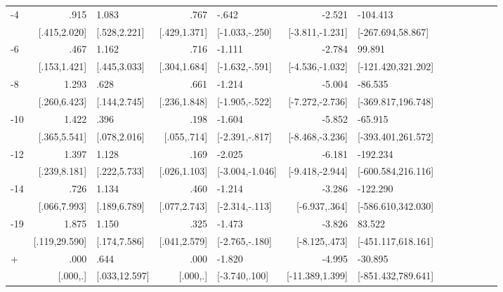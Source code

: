 \begin{table}[h]
\begin{adjustbox}{max width=\linewidth}
\begin{threeparttable}
{\begin{tabular}{l*{6}{D{.}{.}{-1}l}}
-4             &            .915&           1.083&            .767&           -.642&          -2.521&        -104.413\\
                &    [.415,2.020]&    [.528,2.221]&    [.429,1.371]&  [-1.033,-.250]& [-3.811,-1.231]&[-267.694,58.867]\\
-6             &            .467&           1.162&            .716&          -1.111&          -2.784&          99.891\\
                &    [.153,1.421]&    [.445,3.033]&    [.304,1.684]&  [-1.632,-.591]& [-4.536,-1.032]&[-121.420,321.202]\\
-8             &           1.293&            .628&            .661&          -1.214&          -5.004&         -86.535\\
                &    [.260,6.423]&    [.144,2.745]&    [.236,1.848]&  [-1.905,-.522]& [-7.272,-2.736]&[-369.817,196.748]\\
-10            &           1.422&            .396&            .198&          -1.604&          -5.852&         -65.915\\
                &    [.365,5.541]&    [.078,2.016]&     [.055,.714]&  [-2.391,-.817]& [-8.468,-3.236]&[-393.401,261.572]\\
-12           &           1.397&           1.128&            .169&          -2.025&          -6.181&        -192.234\\
                &    [.239,8.181]&    [.222,5.733]&    [.026,1.103]& [-3.004,-1.046]& [-9.418,-2.944]&[-600.584,216.116]\\
-14           &            .726&           1.134&            .460&          -1.214&          -3.286&        -122.290\\
                &    [.066,7.993]&    [.189,6.789]&    [.077,2.743]&  [-2.314,-.113]&   [-6.937,.364]&[-586.610,342.030]\\
-19           &           1.875&           1.150&            .325&          -1.473&          -3.826&          83.522\\
                &   [.119,29.590]&    [.174,7.586]&    [.041,2.579]&  [-2.765,-.180]&   [-8.125,.473]&[-451.117,618.161]\\
+             &            .000&            .644&            .000&          -1.820&          -4.995&         -30.895\\
                &        [.000,.]&   [.033,12.597]&        [.000,.]&   [-3.740,.100]& [-11.389,1.399]&[-851.432,789.641]\\

\end{tabular}}
\end{threeparttable}
\end{adjustbox}
\end{table}
